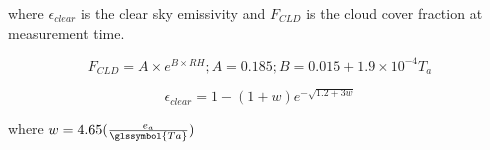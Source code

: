 \documentclass[final,3p,times,authoryear]{elsarticle}
\begin{document}
where $\epsilon_{clear}$ is the clear sky emissivity and $F_{CLD}$ is the cloud cover fraction at measurement time. 

\begin{equation} 
F_{CLD} = A \times e^{B \times RH} ; A=0.185; B=0.015 + 1.9 \times 10^{-4}T_{a}
\label{eq:fcld} \end{equation}

\begin{equation} 
\epsilon_{clear} = 1-(1+w)e^{-\sqrt{1.2+3w}}
\label{eq:eclear} \end{equation}

where $w = 4.65(\frac{e_{a} }{\glssymbol{Ta}})$


%


\end{document}
